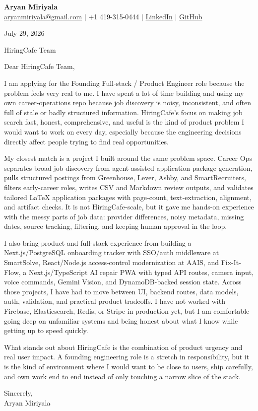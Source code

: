 \documentclass[letterpaper,11pt]{article}
\begin{document}
{\Large\textbf{Aryan Miriyala}}\\
\href{mailto:aryanmiriyala@gmail.com}{aryanmiriyala@gmail.com} $|$ +1 419-315-0444 $|$
\href{https://www.linkedin.com/in/aryan-miriyala-7788a21b6/}{LinkedIn} $|$
\href{https://github.com/aryanmiriyala}{GitHub}

July 29, 2026

HiringCafe Team

Dear HiringCafe Team,

I am applying for the Founding Full-stack / Product Engineer role because the problem feels very real to me. I have spent a lot of time building and using my own career-operations repo because job discovery is noisy, inconsistent, and often full of stale or badly structured information. HiringCafe's focus on making job search fast, honest, comprehensive, and useful is the kind of product problem I would want to work on every day, especially because the engineering decisions directly affect people trying to find real opportunities.

My closest match is a project I built around the same problem space. Career Ops separates broad job discovery from agent-assisted application-package generation, pulls structured postings from Greenhouse, Lever, Ashby, and SmartRecruiters, filters early-career roles, writes CSV and Markdown review outputs, and validates tailored LaTeX application packages with page-count, text-extraction, alignment, and artifact checks. It is not HiringCafe-scale, but it gave me hands-on experience with the messy parts of job data: provider differences, noisy metadata, missing dates, source tracking, filtering, and keeping human approval in the loop.

I also bring product and full-stack experience from building a Next.js/PostgreSQL onboarding tracker with SSO/auth middleware at SmartSolve, React/Node.js access-control modernization at AAIS, and Fix-It-Flow, a Next.js/TypeScript AI repair PWA with typed API routes, camera input, voice commands, Gemini Vision, and DynamoDB-backed session state. Across those projects, I have had to move between UI, backend routes, data models, auth, validation, and practical product tradeoffs. I have not worked with Firebase, Elasticsearch, Redis, or Stripe in production yet, but I am comfortable going deep on unfamiliar systems and being honest about what I know while getting up to speed quickly.

What stands out about HiringCafe is the combination of product urgency and real user impact. A founding engineering role is a stretch in responsibility, but it is the kind of environment where I would want to be close to users, ship carefully, and own work end to end instead of only touching a narrow slice of the stack.

Sincerely,\\
Aryan Miriyala
\end{document}
